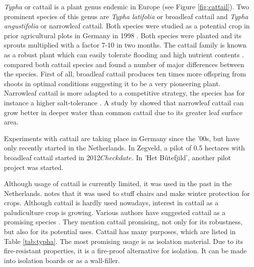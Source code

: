 \documentclass[a4paper,12pt]{scrbook}
\begin{document}
\textit{Typha} or cattail is a plant genus endemic in Europe (see Figure \ref{fig:cattail}). Two prominent species of this genus are \textit{Typha latifolia} or broadleaf cattail and \textit{Typha angustifolia} or narrowleaf cattail. Both species were studied as a potential crop in prior agricultural plots in Germany in 1998 \citep{wild2001cultivation}. Both species were planted and its sprouts multiplied with a factor 7-10 in two months. The cattail family is known as a robust plant which can easily tolerate flooding and high nutrient contents \citep{wild2001cultivation}. \citet{heinz2011population} compared both cattail species and found a number of major differences between the species. First of all, broadleaf cattail produces ten times more offspring from shoots in optimal conditions suggesting it to be a very pioneering plant. Narrowleaf cattail is more adapted to a competitive strategy, the species has for instance a higher salt-tolerance \citep{heinz2011population}. A study by \citet{grace1982niche} showed that narrowleaf cattail can grow better in deeper water than common cattail due to its greater leaf surface area.

Experiments with cattail are taking place in Germany since the '00s, but have only recently started in the Netherlands. In Zegveld, a pilot of 0.5 hectares with broadleaf cattail started in 2012$Check date$. In 'Het B\^utefjild', another pilot project was started. 

Although usage of cattail is currently limited, it was used in the past in the Netherlands. \citet{morton1975cattails} notes that it was used to stuff chairs and make winter protection for crops. Although cattail is hardly used nowadays, interest in cattail as a paludiculture crop is growing. Various authors have suggested cattail as a promising species \citep{morton1975cattails, heinz2011population}. They mention cattail promising, not only for its robustness, but also for its potential uses. Cattail has many purposes, which are listed in Table \ref{tab:typha}. The most promising usage is as isolation material. Due to its fire-resistant properties, it is a fire-proof alternative for isolation. It can be made into isolation boards or as a wall-filler. 

\end{document}
